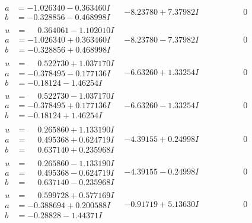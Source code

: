 \documentclass[1p]{elsarticle_modified}
\theoremstyle{definition}
\begin{document}
$$\begin{array}{c|c|c}
\begin{aligned}
a &= -1.026340 - 0.363460 I \\
b &= -0.328856 - 0.468998 I\end{aligned}
 & -8.23780 + 7.37982 I & \phantom{-0.000000 } 0 \\ \hline\begin{aligned}
u &= \phantom{-}0.364061 - 1.102010 I \\
a &= -1.026340 + 0.363460 I \\
b &= -0.328856 + 0.468998 I\end{aligned}
 & -8.23780 - 7.37982 I & \phantom{-0.000000 } 0 \\ \hline\begin{aligned}
u &= \phantom{-}0.522730 + 1.037170 I \\
a &= -0.378495 - 0.177136 I \\
b &= -0.18124 - 1.46254 I\end{aligned}
 & -6.63260 + 1.33254 I & \phantom{-0.000000 } 0 \\ \hline\begin{aligned}
u &= \phantom{-}0.522730 - 1.037170 I \\
a &= -0.378495 + 0.177136 I \\
b &= -0.18124 + 1.46254 I\end{aligned}
 & -6.63260 - 1.33254 I & \phantom{-0.000000 } 0 \\ \hline\begin{aligned}
u &= \phantom{-}0.265860 + 1.133190 I \\
a &= \phantom{-}0.495368 + 0.624719 I \\
b &= \phantom{-}0.637140 + 0.235968 I\end{aligned}
 & -4.39155 + 0.24998 I & \phantom{-0.000000 } 0 \\ \hline\begin{aligned}
u &= \phantom{-}0.265860 - 1.133190 I \\
a &= \phantom{-}0.495368 - 0.624719 I \\
b &= \phantom{-}0.637140 - 0.235968 I\end{aligned}
 & -4.39155 - 0.24998 I & \phantom{-0.000000 } 0 \\ \hline\begin{aligned}
u &= \phantom{-}0.599728 + 0.577169 I \\
a &= -0.388694 + 0.200588 I \\
b &= -0.28828 - 1.44371 I\end{aligned}
 & -0.91719 + 5.13630 I & \phantom{-0.000000 } 0 \\ \hline\begin{aligned}

\end{aligned}
\end{array}$$
\end{document}
